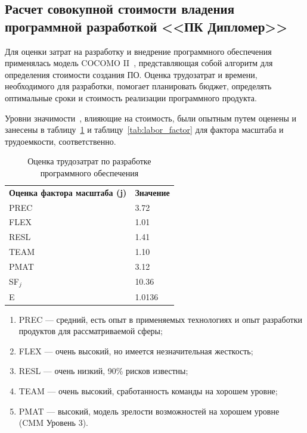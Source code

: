 \subsection{Расчет совокупной стоимости владения программной разработкой <<ПК Дипломер>>}

Для оценки затрат на разработку и внедрение программного обеспечения применялась модель COCOMO II~\cite{bib:cocomoii_gen, bib:cocomoii_win}, представляющая собой алгоритм для определения стоимости создания ПО. Оценка трудозатрат и времени, необходимого для разработки, помогает планировать бюджет, определять оптимальные сроки и стоимость реализации программного продукта.

Уровни значимости~\cite[c. 22-24]{bib:scale_f}, влияющие на стоимость, были опытным путем оценены и занесены в таблицу~\ref{tab:scale_factor} и таблицу~\ref{tab:labor_factor} для фактора масштаба и трудоемкости, соответственно.

\begin{table}[H]
    \caption{Оценка трудозатрат по разработке программного обеспечения}
    \centering

    \emergencystretch=10pt
    \begin{tabular}{@{}ll@{}}
        \toprule
        \textbf{Оценка фактора масштаба (j)} & \textbf{Значение} \\
        PREC & 3.72 \\
        FLEX & 1.01 \\
        RESL & 1.41 \\
        TEAM & 1.10 \\
        PMAT & 3.12 \\
        \midrule
        SF$_j$ & 10.36 \\
        E & 1.0136 \\
        \bottomrule
    \end{tabular}
    \label{tab:scale_factor}
\end{table}

\begin{enumerate}
    \item PREC --- средний, есть опыт в применяемых технологиях и опыт разработки продуктов для рассматриваемой сферы;
    \item FLEX --- очень высокий, но имеется незначительная жесткость;
    \item RESL --- очень низкий, 90\% рисков известны;
    \item TEAM --- очень высокий, сработанность команды на хорошем уровне;
    \item PMAT --- высокий, модель зрелости возможностей на хорошем уровне (CMM Уровень 3).
\end{enumerate}

